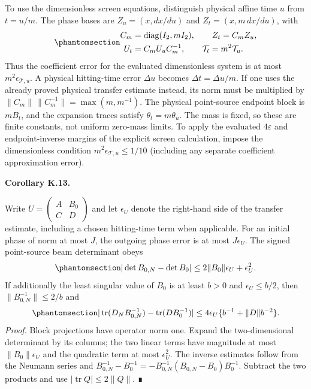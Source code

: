 \documentclass[
  english,
  11pt,
  reqno]{amsart}
\makeatletter
\newcommand{\pandocstatementheading}[1]{%
  \par\addpenalty{\@beginparpenalty}%
  \addvspace{.5\baselineskip plus .2\baselineskip minus .2\baselineskip}%
  {\normalfont\bfseries #1\par}%
  \nobreak\@afterindenttrue\@afterheading
}
\makeatother
\begin{document}
To use the dimensionless screen equations, distinguish physical affine
time \(u\) from \(t=u/m\). The phase bases are \(Z_u=(x,dx/du)\) and
\(Z_t=(x,m\,dx/du)\), with
\begin{equation}\protect\phantomsection\label{eq:sh-phase-time-dictionary}{
 \begin{aligned}
 C_m&=\operatorname{diag}(I_2,mI_2),\qquad Z_t=C_mZ_u,\\
 U_t&=C_mU_uC_m^{-1},\qquad \mathcal T_t=m^2\mathcal T_u.
 \end{aligned}
}\end{equation} Thus the coefficient error for the evaluated
dimensionless system is at most \(m^2\epsilon_{\mathcal T,u}\). A
physical hitting-time error \(\Delta u\) becomes
\(\Delta t=\Delta u/m\). If one uses the already proved physical
transfer estimate instead, its norm must be multiplied by
\(\|C_m\|\,\|C_m^{-1}\|=\max(m,m^{-1})\). The physical point-source
endpoint block is \(mB_t\), and the expansion traces satisfy
\(\theta_t=m\theta_u\). The mass is fixed, so these are finite
constants, not uniform zero-mass limits. To apply the evaluated
\(4\varepsilon\) and endpoint-inverse margins of the explicit screen
calculation, impose the dimensionless condition
\(m^2\epsilon_{\mathcal T,u}\le1/10\) (including any separate
coefficient approximation error).

\pandocstatementheading{\protect{}\label{cor:sh-optical-observables}Corollary K.13.}

Write \(U=\left(\begin{smallmatrix}A&B_0\\ C&D\end{smallmatrix}\right)\)
and let \(\epsilon_U\) denote the right-hand side of the transfer
estimate, including a chosen hitting-time term when applicable. For an
initial phase of norm at most \(J\), the outgoing phase error is at most
\(J\epsilon_U\). The signed point-source beam determinant obeys
\begin{equation}\protect\phantomsection\label{eq:sh-beam-determinant-error}{
 |\det B_{0,N}-\det B_0|
 \le2\|B_0\|\epsilon_U+\epsilon_U^2.
}\end{equation} If additionally the least singular value of \(B_0\) is
at least \(b>0\) and \(\epsilon_U\le b/2\), then
\(\|B_{0,N}^{-1}\|\le2/b\) and
\begin{equation}\protect\phantomsection\label{eq:sh-expansion-error}{
 |\operatorname{tr}(D_NB_{0,N}^{-1})-\operatorname{tr}(DB_0^{-1})|
 \le4\epsilon_U\{b^{-1}+\|D\|b^{-2}\}.
}\end{equation} \emph{Proof.} Block projections have operator norm one.
Expand the two-dimensional determinant by its columns; the two linear
terms have magnitude at most \(\|B_0\|\epsilon_U\) and the quadratic
term at most \(\epsilon_U^2\). The inverse estimates follow from the
Neumann series and
\(B_{0,N}^{-1}-B_0^{-1}=-B_{0,N}^{-1}(B_{0,N}-B_0)B_0^{-1}\). Subtract
the two products and use \(|\operatorname{tr}Q|\le2\|Q\|\). ∎
\end{document}
